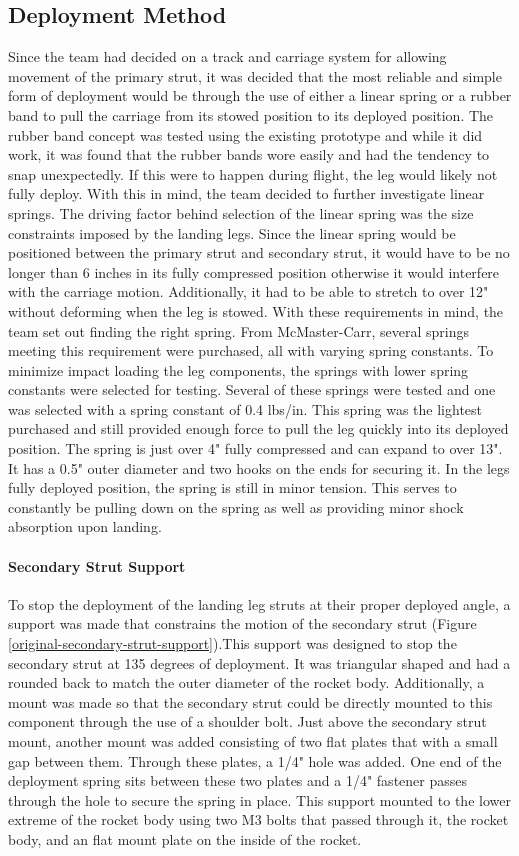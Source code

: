 \subsection{Deployment Method}
Since the team had decided on a track and carriage system for allowing movement of the primary strut, it was decided that the most reliable and simple form of deployment would be through the use of either a linear spring or a rubber band to pull the carriage from its stowed position to its deployed position. The rubber band concept was tested using the existing prototype and while it did work, it was found that the rubber bands wore easily and had the tendency to snap unexpectedly. If this were to happen during flight, the leg would likely not fully deploy. With this in mind, the team decided to further investigate linear springs. The driving factor behind selection of the linear spring was the size constraints imposed by the landing legs. Since the linear spring would be positioned between the primary strut and secondary strut, it would have to be no longer than 6 inches in its fully compressed position otherwise it would interfere with the carriage motion. Additionally, it had to be able to stretch to over 12" without deforming when the leg is stowed. With these requirements in mind, the team set out finding the right spring. From McMaster-Carr, several springs meeting this requirement were purchased, all with varying spring constants. To minimize impact loading the leg components, the springs with lower spring constants were selected for testing. Several of these springs were tested and one was selected with a spring constant of 0.4 lbs/in. This spring was the lightest purchased and still provided enough force to pull the leg quickly into its deployed position. The spring is just over 4" fully compressed and can expand to over 13". It has a 0.5" outer diameter and two hooks on the ends for securing it. In the legs fully deployed position, the spring is still in minor tension. This serves to constantly be pulling down on the spring as well as providing minor shock absorption upon landing.

\paragraph{Secondary Strut Support}
To stop the deployment of the landing leg struts at their proper deployed angle, a support was made that constrains the motion of the secondary strut (Figure \ref{original-secondary-strut-support}).This support was designed to stop the secondary strut at 135 degrees of deployment. It was triangular shaped and had a rounded back to match the outer diameter of the rocket body. Additionally, a mount was made so that the secondary strut could be directly mounted to this component through the use of a shoulder bolt. Just above the secondary strut mount, another mount was added consisting of two flat plates that with a small gap between them. Through these plates, a 1/4" hole was added. One end of the deployment spring sits between these two plates and a 1/4" fastener passes through the hole to secure the spring in place. This support mounted to the lower extreme of the rocket body using two M3 bolts that passed through it, the rocket body, and an flat mount plate on the inside of the rocket.


